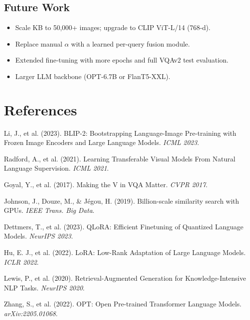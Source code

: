 \documentclass[12pt, a4paper]{article}
\begin{document}
\subsection{Future Work}

\begin{itemize}[leftmargin=1.5cm]
    \item Scale KB to 50,000+ images; upgrade to CLIP ViT-L/14 (768-d).
    \item Replace manual $\alpha$ with a learned per-query fusion module.
    \item Extended fine-tuning with more epochs and full VQAv2 test evaluation.
    \item Larger LLM backbone (OPT-6.7B or FlanT5-XXL).
\end{itemize}

\section*{References}

\begin{enumerate}[label={[\arabic*]}, leftmargin=1.5cm]
    \item Li, J., et al. (2023). BLIP-2: Bootstrapping Language-Image Pre-training with Frozen Image Encoders and Large Language Models. \textit{ICML 2023}.
    \item Radford, A., et al. (2021). Learning Transferable Visual Models From Natural Language Supervision. \textit{ICML 2021}.
    \item Goyal, Y., et al. (2017). Making the V in VQA Matter. \textit{CVPR 2017}.
    \item Johnson, J., Douze, M., \& J\'{e}gou, H. (2019). Billion-scale similarity search with GPUs. \textit{IEEE Trans. Big Data}.
    \item Dettmers, T., et al. (2023). QLoRA: Efficient Finetuning of Quantized Language Models. \textit{NeurIPS 2023}.
    \item Hu, E. J., et al. (2022). LoRA: Low-Rank Adaptation of Large Language Models. \textit{ICLR 2022}.
    \item Lewis, P., et al. (2020). Retrieval-Augmented Generation for Knowledge-Intensive NLP Tasks. \textit{NeurIPS 2020}.
    \item Zhang, S., et al. (2022). OPT: Open Pre-trained Transformer Language Models. \textit{arXiv:2205.01068}.
\end{enumerate}
\end{document}
